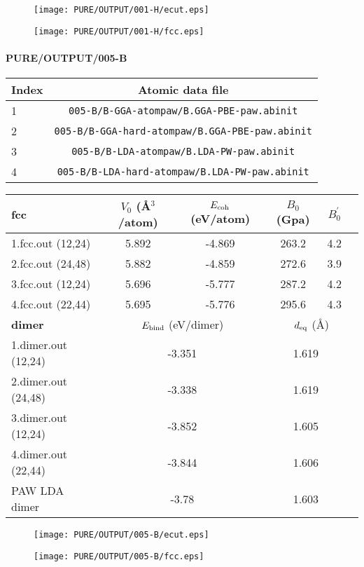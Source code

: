 \documentclass[onecolumn]{revtex4}
\begin{document}
\begin{figure}[h] 
\centering 
\texttt{[image: PURE/OUTPUT/001-H/ecut.eps]}
\end{figure}
\begin{figure}[h] 
\centering 
\texttt{[image: PURE/OUTPUT/001-H/fcc.eps]}
\end{figure}
\newpage
\paragraph*{\bf{PURE/OUTPUT/005-B}}
\begin{center}
\begin{tabular}{lc}
\hline
Index & Atomic data file \\
\hline
1 & \verb?005-B/B-GGA-atompaw/B.GGA-PBE-paw.abinit?\\
2 & \verb?005-B/B-GGA-hard-atompaw/B.GGA-PBE-paw.abinit?\\
3 & \verb?005-B/B-LDA-atompaw/B.LDA-PW-paw.abinit?\\
4 & \verb?005-B/B-LDA-hard-atompaw/B.LDA-PW-paw.abinit?\\
\hline
\end{tabular}
\end{center}
\begin{center}
\begin{tabular}{lccccc}
\hline
\hline
\bf{fcc}&$V_0$ (\AA$^3$/atom)&$E_{\rm coh}$ (eV/atom)&$B_0$ (Gpa)&$B_0^{'}$& \\
\hline
1.fcc.out (12,24)& 5.892 &-4.869 & 263.2 & 4.2 & \\ 
2.fcc.out (24,48)& 5.882 &-4.859 & 272.6 & 3.9 & \\ 
3.fcc.out (12,24)& 5.696 &-5.777 & 287.2 & 4.2 & \\ 
4.fcc.out (22,44)& 5.695 &-5.776 & 295.6 & 4.3 & \\ 
\hline
\hline
\bf{dimer}&\multicolumn{2}{c}{$E_{\rm bind}$ (eV/dimer)}&\multicolumn{3}{c}{$d_{\rm eq}$ (\AA)} \\
\hline
1.dimer.out (12,24)&\multicolumn{2}{c}{-3.351}&\multicolumn{2}{c}{1.619} \\ 
2.dimer.out (24,48)&\multicolumn{2}{c}{-3.338}&\multicolumn{2}{c}{1.619} \\ 
3.dimer.out (12,24)&\multicolumn{2}{c}{-3.852}&\multicolumn{2}{c}{1.605} \\ 
4.dimer.out (22,44)&\multicolumn{2}{c}{-3.844}&\multicolumn{2}{c}{1.606} \\ 
PAW LDA dimer~\cite{Blochl_PRB50_1994} & \multicolumn{2}{c}{-3.78} & \multicolumn{2}{c}{1.603} \\ %
\hline
\hline
\end{tabular}
\end{center}
\begin{figure}[h] 
\centering 
\texttt{[image: PURE/OUTPUT/005-B/ecut.eps]}
\end{figure}
\begin{figure}[h] 
\centering 
\texttt{[image: PURE/OUTPUT/005-B/fcc.eps]}
\end{figure}
\newpage
\end{document}
